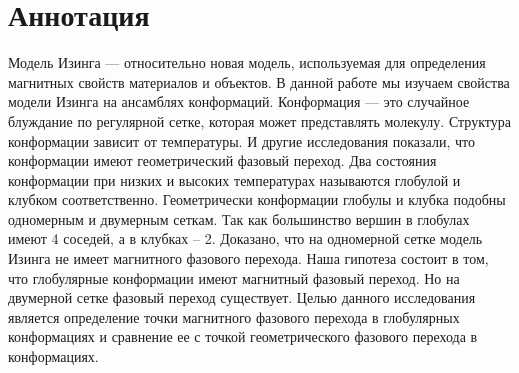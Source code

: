 \section*{Аннотация}
Модель Изинга — относительно новая модель, используемая для определения магнитных свойств материалов и объектов. В данной работе мы изучаем свойства модели Изинга на ансамблях конформаций. Конформация — это случайное блуждание по регулярной сетке, которая может представлять молекулу. Структура конформации зависит от температуры. И другие исследования показали, что конформации имеют геометрический фазовый переход. Два состояния конформации при низких и высоких температурах называются глобулой и клубком соответственно. Геометрически конформации глобулы и клубка подобны одномерным и двумерным сеткам. Так как большинство вершин в глобулах имеют 4 соседей, а в клубках – 2. Доказано, что на одномерной сетке модель Изинга не имеет магнитного фазового перехода. Наша гипотеза состоит в том, что глобулярные конформации имеют магнитный фазовый переход. Но на двумерной сетке фазовый переход существует. Целью данного исследования является определение точки магнитного фазового перехода в глобулярных конформациях и сравнение ее с точкой геометрического фазового перехода в конформациях.